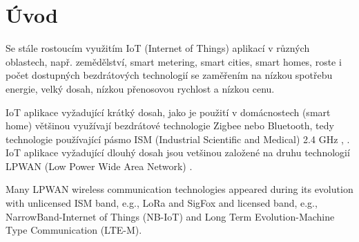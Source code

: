 \chapter{Úvod}
Se stále rostoucím využitím IoT (Internet of Things) aplikací v různých oblastech, např. zemědělství, smart metering, smart cities, smart homes, roste i počet dostupných bezdrátových technologií se zaměřením na 
nízkou spotřebu energie, velký dosah, nízkou přenosovou rychlost a nízkou cenu.

IoT aplikace vyžadující krátký dosah, jako je použití v domácnostech (smart home) většinou využívají bezdrátové technologie Zigbee nebo Bluetooth, tedy technologie používající pásmo ISM (Industrial Scientific and Medical) 2.4 GHz \cite{Design and Implementation of an IoT Assisted Real Time ZigBee Mesh WSN}, \cite{Internet of Things (IoT) for building Smart Home System}.
IoT aplikace vyžadující dlouhý dosah jsou vetšinou založené na druhu technologií LPWAN (Low Power Wide Area Network) \cite{A comparative study of LPWAN technologies for large-scale IoTdeployment}. 

Many LPWAN wireless communication technologies appeared during its evolution with unlicensed ISM band, e.g., LoRa and SigFox and licensed band, e.g., NarrowBand-Internet of Things (NB-IoT) and Long Term Evolution-Machine Type Communication (LTE-M).

